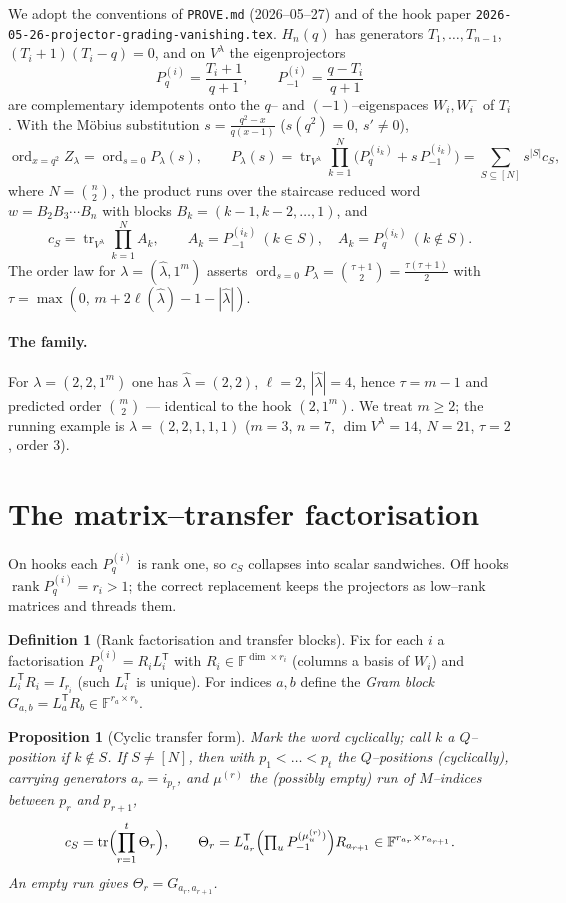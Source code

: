 \documentclass[11pt]{article}
\newtheorem{proposition}[theorem]{Proposition}
\theoremstyle{definition}
\newtheorem{definition}[theorem]{Definition}
\DeclareMathOperator{\tr}{tr}
\DeclareMathOperator{\ord}{ord}
\DeclareMathOperator{\rank}{rank}
\newcommand{\Pq}{P_{q}}
\newcommand{\Pm}{P_{-1}}
\newcommand{\la}{\lambda}
\newcommand{\W}{W}
\begin{document}
We adopt the conventions of \texttt{PROVE.md} (2026--05--27) and of the hook paper
\texttt{2026-05-26-projector-grading-vanishing.tex}. $H_n(q)$ has generators
$T_1,\dots,T_{n-1}$, $(T_i+1)(T_i-q)=0$, and on $V^\la$ the eigenprojectors
\[
\Pq^{(i)}=\frac{T_i+1}{q+1},\qquad \Pm^{(i)}=\frac{q-T_i}{q+1}
\]
are complementary idempotents onto the $q$-- and $(-1)$--eigenspaces $\W_i,\W_i^-$ of
$T_i$. With the M\"obius substitution $s=\tfrac{q^2-x}{q(x-1)}$ ($s(q^2)=0$, $s'\ne0$),
\[
\ord_{x=q^2}Z_\la=\ord_{s=0}P_\la(s),\qquad
P_\la(s)=\tr_{V^\la}\prod_{k=1}^N\bigl(\Pq^{(i_k)}+s\,\Pm^{(i_k)}\bigr)
=\sum_{S\subseteq[N]}s^{|S|}c_S,
\]
where $N=\binom n2$, the product runs over the staircase reduced word
$w=B_2B_3\cdots B_n$ with blocks $B_k=(k-1,k-2,\dots,1)$, and
\[
c_S=\tr_{V^\la}\prod_{k=1}^N A_k,\qquad A_k=\Pm^{(i_k)}\ (k\in S),\quad
A_k=\Pq^{(i_k)}\ (k\notin S).
\]
The order law for $\la=(\hat\la,1^m)$ asserts
$\ord_{s=0}P_\la=\binom{\tau+1}2=\tfrac{\tau(\tau+1)}2$ with
$\tau=\max(0,\,m+2\ell(\hat\la)-1-|\hat\la|)$.

\paragraph{The family.} For $\la=(2,2,1^m)$ one has $\hat\la=(2,2)$, $\ell=2$,
$|\hat\la|=4$, hence $\tau=m-1$ and predicted order $\binom m2$ --- identical to the hook
$(2,1^m)$. We treat $m\ge2$; the running example is $\la=(2,2,1,1,1)$ ($m=3$, $n=7$,
$\dim V^\la=14$, $N=21$, $\tau=2$, order $3$).

\section{The matrix--transfer factorisation}

On hooks each $\Pq^{(i)}$ is rank one, so $c_S$ collapses into scalar sandwiches. Off
hooks $\rank\Pq^{(i)}=r_i>1$; the correct replacement keeps the projectors as low--rank
matrices and threads them.

\begin{definition}[Rank factorisation and transfer blocks]
Fix for each $i$ a factorisation $\Pq^{(i)}=R_i L_i^{\mathsf T}$ with $R_i\in\mathbb
F^{\dim\times r_i}$ (columns a basis of $\W_i$) and $L_i^{\mathsf T}R_i=I_{r_i}$
(such $L_i^{\mathsf T}$ is unique). For indices $a,b$ define the \emph{Gram block}
$G_{a,b}=L_a^{\mathsf T}R_b\in\mathbb F^{r_a\times r_b}$.
\end{definition}

\begin{proposition}[Cyclic transfer form]\label{prop:transfer}
Mark the word cyclically; call $k$ a \emph{$Q$--position} if $k\notin S$. If
$S\ne[N]$, then with $p_1<\dots<p_t$ the $Q$--positions (cyclically), carrying generators
$a_r=i_{p_r}$, and $\mu^{(r)}$ the (possibly empty) run of $M$--indices between $p_r$ and
$p_{r+1}$,
\[
c_S=\tr\Bigl(\prod_{r=1}^{t}\Theta_r\Bigr),\qquad
\Theta_r=L_{a_r}^{\mathsf T}\Bigl(\textstyle\prod_{u}\Pm^{(\mu^{(r)}_u)}\Bigr)R_{a_{r+1}}
\in\mathbb F^{r_{a_r}\times r_{a_{r+1}}}.
\]
An empty run gives $\Theta_r=G_{a_r,a_{r+1}}$.
\end{proposition}
\end{document}
